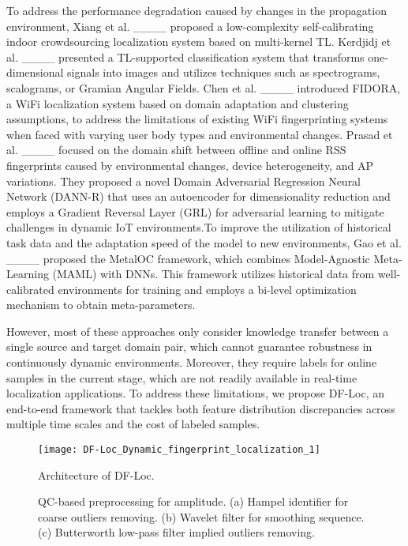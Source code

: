 To address the performance degradation caused by changes in the propagation environment, Xiang et al. ____ proposed a low-complexity self-calibrating indoor crowdsourcing localization system based on multi-kernel TL.  Kerdjidj et al. ____ presented a TL-supported classification system that transforms one-dimensional signals into images and utilizes techniques such as spectrograms, scalograms, or Gramian Angular Fields. Chen et al. ____ introduced FIDORA, a WiFi localization system based on domain adaptation and clustering assumptions, to address the limitations of existing WiFi fingerprinting systems when faced with varying user body types and environmental changes. Prasad et al. ____ focused on the domain shift between offline and online RSS fingerprints caused by environmental changes, device heterogeneity, and AP variations. They proposed a novel Domain Adversarial Regression Neural Network (DANN-R) that uses an autoencoder for dimensionality reduction and employs a Gradient Reversal Layer (GRL) for adversarial learning to mitigate challenges in dynamic IoT environments.To improve the utilization of historical task data and the adaptation speed of the model to new environments, Gao et al. ____ proposed the MetalOC framework, which combines Model-Agnostic Meta-Learning (MAML) with DNNs. This framework utilizes historical data from well-calibrated environments for training and employs a bi-level optimization mechanism to obtain meta-parameters.

However, most of these approaches only consider knowledge transfer between a single source and target domain pair, which cannot guarantee robustness in continuously dynamic environments. Moreover, they require labels for online samples in the current stage, which are not readily available in real-time localization applications.  To address these limitations, we propose DF-Loc, an end-to-end framework that tackles both feature distribution discrepancies across multiple time scales and the cost of labeled samples.

\begin{figure*}[!t]
	\centering
	\texttt{[image: DF-Loc\_Dynamic\_fingerprint\_localization\_1]}
	\caption{Architecture of DF-Loc.}
	\label{fig_1}
\end{figure*}

\begin{figure*}[!t]
	\centering
	\hfil
	\hfil
	\caption{QC-based preprocessing for amplitude. (a) Hampel identifier for coarse outliers removing. (b) Wavelet filter for smoothing sequence. (c) Butterworth low-pass filter implied outliers removing.}
	\label{fig_4}
\end{figure*}